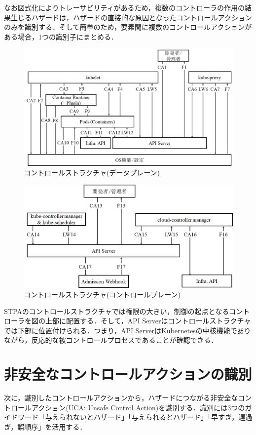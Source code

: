 \documentclass[12pt,a4j]{ujreport}
\begin{document}
なお図式化によりトレーサビリティがあるため，複数のコントローラの作用の結果生じるハザードは，ハザードの直接的な原因となったコントロールアクションのみを識別する．そして簡単のため，要素間に複数のコントロールアクションがある場合，1つの識別子にまとめる．
\newpage
\begin{figure}[tb]
    \centerline{\includegraphics[clip,width=140mm]{images/cs-dataplane.jpg}}
    \caption{コントロールストラクチャ(データプレーン)}\label{fig7}
\end{figure}
\begin{figure}[h]
    \centerline{\includegraphics[clip,width=140mm]{images/cs-controlplane.jpg}}
    \caption{コントロールストラクチャ(コントロールプレーン)}\label{fig8}
\end{figure}

STPAのコントロールストラクチャでは権限の大きい，制御の起点となるコントローラを図の上部に配置する．そして，API Serverはコントロールストラクチャでは下部に位置付けられる．つまり，API ServerはKubernetesの中核機能でありながら，反応的な被コントロールプロセスであることが確認できる．

\section{非安全なコントロールアクションの識別}
次に，識別したコントロールアクションから，ハザードにつながる非安全なコントロールアクション(UCA: Unsafe Control Action)を識別する．識別には3つのガイドワード「与えられないとハザード」「与えられるとハザード」「早すぎ，遅過ぎ，誤順序」を活用する．
\end{document}
